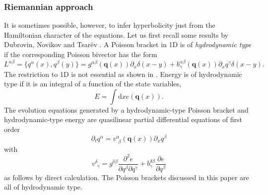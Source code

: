 \documentclass[
10pt, %
a4paper, %
oneside, %
headinclude,footinclude, %
BCOR5mm, %
]{scrartcl}
\newcommand{\diff}{\mathrm{d}}
\newcommand{\qq}{\mathbf{q}}
\newcommand{\MP}[1]{{\color{OliveGreen}MP:\ \ #1}}
\newcommand{\IP}[1]{{\color{Red}IP:\ \ #1}}
\newcommand{\pd}{\partial}
\newcommand{\vab}[2]{v^{#1}_{\ \, #2}}
\begin{document}
\subsubsection{Riemannian approach}
It is sometimes possible, however, to infer hyperbolicity just from the Hamiltonian character of 
the equations. Let us first recall some results by Dubrovin, Novikov \cite{Novikov} and Tsar{\" e}v 
\cite{Tsarev}. 
A Poisson bracket in 1D is of \textit{hydrodynamic type} if the corresponding Poisson bivector has 
the form
\begin{equation}\label{eqn.bivector.hydro}
	L^{\alpha\beta} = \{q^\alpha(x),q^\beta(y)\} = g^{\alpha\beta}(\qq(x)) \partial_x \delta(x-y) + b^{\alpha\beta}_\gamma (\qq(x)) \partial_x q^\gamma \delta(x-y).
\end{equation}
The restriction to 1D is not essential as shown in \cite{Dubrovin-Novikov}.
Energy is of hydrodynamic type if it is an integral of a function of the state variables, 
\begin{equation}
	E = \int \diff x e(\qq(x)).
\end{equation}
The evolution equations generated by a hydrodynamic-type Poisson bracket and hydrodynamic-type energy are quasilinear partial differential equations of first order
\begin{equation}\label{eqn.hydro.type}
	\partial_t q^\alpha = \vab{\alpha}{\beta}(\qq(x)) \partial_x q^\beta
\end{equation}
with
\begin{equation}
	\vab{\delta}{\gamma} = g^{\delta\beta} \frac{\partial^2 e}{\partial q^\beta \partial q^\gamma} + b^{\delta\beta}_\gamma \frac{\partial e}{\partial q^\beta}
\end{equation}
as follows by direct calculation.
The Poisson brackets discussed in this paper are all of hydrodynamic type.

\end{document}
